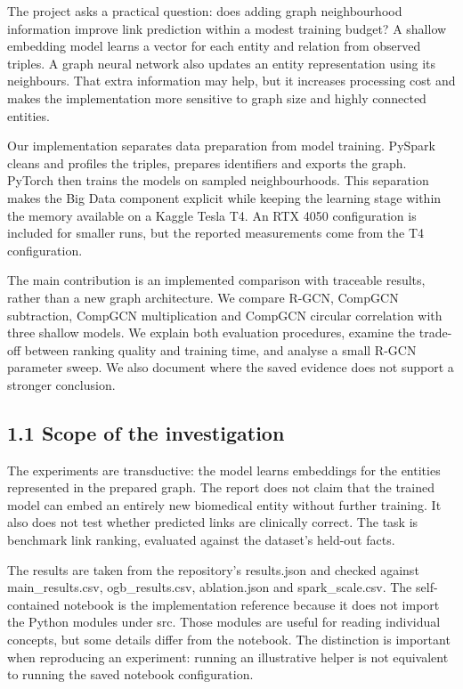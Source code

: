 \documentclass[11pt]{article}
\begin{document}
The project asks a practical question: does adding graph neighbourhood information improve link prediction within a modest training budget? A shallow embedding model learns a vector for each entity and relation from observed triples. A graph neural network also updates an entity representation using its neighbours. That extra information may help, but it increases processing cost and makes the implementation more sensitive to graph size and highly connected entities.

Our implementation separates data preparation from model training. PySpark cleans and profiles the triples, prepares identifiers and exports the graph. PyTorch then trains the models on sampled neighbourhoods. This separation makes the Big Data component explicit while keeping the learning stage within the memory available on a Kaggle Tesla T4. An RTX 4050 configuration is included for smaller runs, but the reported measurements come from the T4 configuration.

The main contribution is an implemented comparison with traceable results, rather than a new graph architecture. We compare R-GCN, CompGCN subtraction, CompGCN multiplication and CompGCN circular correlation with three shallow models. We explain both evaluation procedures, examine the trade-off between ranking quality and training time, and analyse a small R-GCN parameter sweep. We also document where the saved evidence does not support a stronger conclusion.

\subsection*{1.1 Scope of the investigation}
The experiments are transductive: the model learns embeddings for the entities represented in the prepared graph. The report does not claim that the trained model can embed an entirely new biomedical entity without further training. It also does not test whether predicted links are clinically correct. The task is benchmark link ranking, evaluated against the dataset's held-out facts.

The results are taken from the repository's results.json and checked against main\_results.csv, ogb\_results.csv, ablation.json and spark\_scale.csv. The self-contained notebook is the implementation reference because it does not import the Python modules under src. Those modules are useful for reading individual concepts, but some details differ from the notebook. The distinction is important when reproducing an experiment: running an illustrative helper is not equivalent to running the saved notebook configuration.
\end{document}
